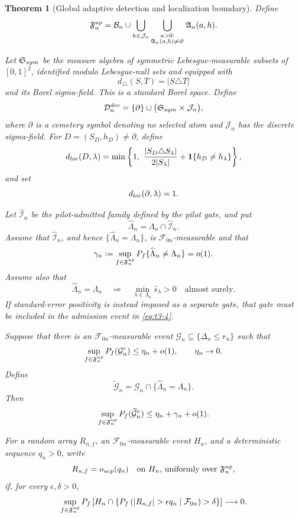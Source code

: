 \documentclass[10pt,a4paper]{amsart}
\newtheorem{theorem}{Theorem}
\begin{document}
\begin{theorem}[Global adaptive detection and localization boundary]
Define
\[
\mathfrak F_n^{\rm up}
=
\mathcal B_n
\cup
\bigcup_{h\in\mathcal J_n}
\bigcup_{\substack{a>0:\\
                   \mathfrak A_n(a,h)\ne\varnothing}}
\mathfrak A_n(a,h).
\]

Let \(\mathfrak S_{\rm sym}\) be the measure algebra of symmetric
Lebesgue-measurable subsets of \([0,1]^2\), identified modulo
Lebesgue-null sets and equipped with
\[
d_\triangle(S,T)=|S\triangle T|
\]
and its Borel sigma-field.  This is a standard Borel space.  Define
\[
\mathcal D_n^{\rm dec}
=
\{\partial\}
\sqcup
\bigl(\mathfrak S_{\rm sym}\times\mathcal J_n\bigr),
\]
where \(\partial\) is a cemetery symbol denoting no selected atom and
\(\mathcal J_n\) has the discrete sigma-field.  For
\(D=(S_D,h_D)\ne\partial\), define
\[
d_{\rm loc}(D,\lambda)
=
\min\left\{
1,\
\frac{|S_D\triangle S_\lambda|}{2|S_\lambda|}
+
\mathbf 1\{h_D\ne h_\lambda\}
\right\},
\]
and set
\[
d_{\rm loc}(\partial,\lambda)=1.
\]

Let \(\widehat{\mathcal I}_n\) be the pilot-admitted family defined
by the pilot gate, and put
\[
\widehat\Lambda_n
=
\Lambda_n\cap\widehat{\mathcal I}_n.
\]
Assume that \(\widehat{\mathcal I}_n\), and hence
\(\{\widehat\Lambda_n=\Lambda_n\}\), is
\(\mathcal F_{0n}\)-measurable and that
\begin{equation}
\gamma_n
:=
\sup_{f\in\mathfrak F_n^{\rm up}}
P_f\{\widehat\Lambda_n\ne\Lambda_n\}
=o(1).
\label{eq:t3-4}
\end{equation}
Assume also that
\[
\widehat\Lambda_n=\Lambda_n
\quad\Longrightarrow\quad
\min_{\lambda\in\Lambda_n}\widehat s_\lambda>0
\quad\text{almost surely}.
\]
If standard-error positivity is instead imposed as a separate gate,
that gate must be included in the admission event in
\eqref{eq:t3-4}.

Suppose that there is an \(\mathcal F_{0n}\)-measurable event
\(\mathcal G_n\subseteq\{\Delta_n\le r_n\}\) such that
\begin{equation}
\sup_{f\in\mathfrak F_n^{\rm up}}
P_f(\mathcal G_n^c)
\le\eta_n+o(1),
\qquad
\eta_n\to0.
\label{eq:t3-5}
\end{equation}
Define
\[
\widetilde{\mathcal G}_n
=
\mathcal G_n
\cap
\{\widehat\Lambda_n=\Lambda_n\}.
\]
Then
\begin{equation}
\sup_{f\in\mathfrak F_n^{\rm up}}
P_f(\widetilde{\mathcal G}_n^c)
\le
\eta_n+\gamma_n+o(1).
\label{eq:t3-6}
\end{equation}

For a random array \(R_{n,f}\), an
\(\mathcal F_{0n}\)-measurable event \(H_n\), and a deterministic
sequence \(q_n>0\), write
\[
R_{n,f}=o_{\rm ucp}(q_n)
\quad
\text{on \(H_n\), uniformly over \(\mathfrak F_n^{\rm up}\),}
\]
if, for every \(\epsilon,\delta>0\),
\[
\sup_{f\in\mathfrak F_n^{\rm up}}
P_f\left[
H_n
\cap
\left\{
P_f\left(
|R_{n,f}|>\epsilon q_n
\mid\mathcal F_{0n}
\right)>\delta
\right\}
\right]
\longrightarrow0.
\]


\end{theorem}
\end{document}
